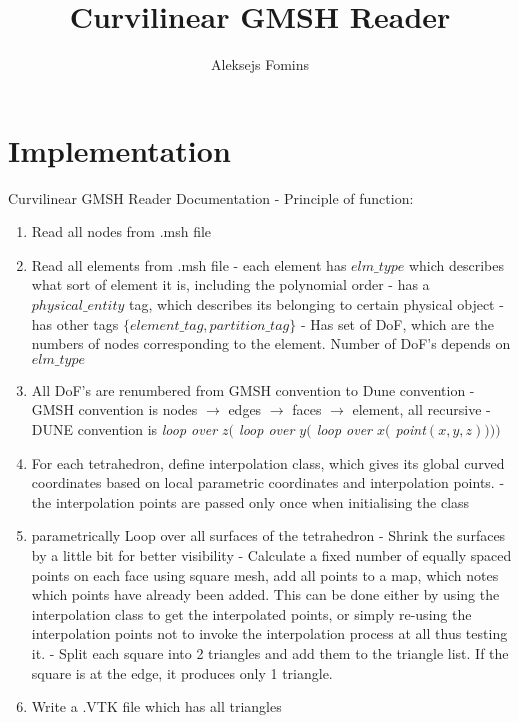 \documentclass[12pt]{article}
\title{Curvilinear GMSH Reader}
\author{Aleksejs Fomins}
\date{}
\begin{document}
 


\maketitle 


\section{Implementation}

Curvilinear GMSH Reader Documentation - Principle of function:

\begin{enumerate}
  \item Read all nodes from .msh file
  \item Read all elements from .msh file
      \subitem - each element has $elm\_type$ which describes what sort of element it is, including the polynomial order
      \subitem - has a $physical\_entity$ tag, which describes its belonging to certain physical object
      \subitem - has other tags $\{ element\_tag, partition\_tag\}$
      \subitem - Has set of DoF, which are the numbers of nodes corresponding to the element. Number of DoF's depends on $elm\_type$
  \item All DoF's are renumbered from GMSH convention to Dune convention
      \subitem - GMSH convention is nodes $\rightarrow$ edges $\rightarrow$ faces $\rightarrow$ element, all recursive
      \subitem - DUNE convention is \textit{loop over $z ($ loop over $y ($ loop over $x ($ point$(x,y,z) ) ))$}
  \item For each tetrahedron, define interpolation class, which gives its global curved coordinates based on local parametric coordinates and interpolation points.
      \subitem - the interpolation points are passed only once when initialising the class
  \item parametrically Loop over all surfaces of the tetrahedron
      \subitem - Shrink the surfaces by a little bit for better visibility
      \subitem - Calculate a fixed number of equally spaced points on each face using square mesh, add all points to a map, which notes which points have already been added. This can be done either by using the interpolation class to get the interpolated points, or simply re-using the interpolation points not to invoke the interpolation process at all thus testing it.
      \subitem - Split each square into 2 triangles and add them to the triangle list. If the square is at the edge, it produces only 1 triangle.
  \item Write a .VTK file which has all triangles
\end{enumerate}
\end{document}
